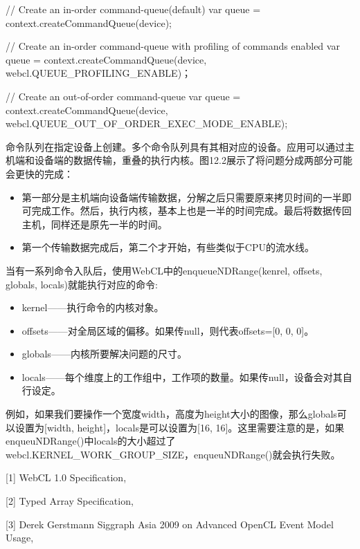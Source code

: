 \begin{codebox}[javascript]
// Create an in-order command-queue(default)
var queue = context.createCommandQueue(device);

// Create an in-order command-queue with profiling of commands enabled
var queue = context.createCommandQueue(device, webcl.QUEUE_PROFILING_ENABLE)；

// Create an out-of-order command-queue
var queue = context.createCommandQueue(device, webcl.QUEUE_OUT_OF_ORDER_EXEC_MODE_ENABLE);
\end{codebox}

命令队列在指定设备上创建。多个命令队列具有其相对应的设备。应用可以通过主机端和设备端的数据传输，重叠的执行内核。图12.2展示了将问题分成两部分可能会更快的完成：


\begin{itemize}
\item 第一部分是主机端向设备端传输数据，分解之后只需要原来拷贝时间的一半即可完成工作。然后，执行内核，基本上也是一半的时间完成。最后将数据传回主机，同样还是原先一半的时间。
\item 第一个传输数据完成后，第二个才开始，有些类似于CPU的流水线。
\end{itemize}

当有一系列命令入队后，使用WebCL中的enqueueNDRange(kenrel, offsets, globals, locals)就能执行对应的命令:

\begin{itemize}
\item kernel——执行命令的内核对象。
\item offsets——对全局区域的偏移。如果传null，则代表offsets=[0, 0, 0]。
\item globals——内核所要解决问题的尺寸。
\item locals——每个维度上的工作组中，工作项的数量。如果传null，设备会对其自行设定。
\end{itemize}

例如，如果我们要操作一个宽度width，高度为height大小的图像，那么globals可以设置为[width, height]，locals是可以设置为[16, 16]。这里需要注意的是，如果enqueuNDRange()中locals的大小超过了webcl.KERNEL\_\allowbreak{}WORK\_\allowbreak{}GROUP\_\allowbreak{}SIZE，enqueuNDRange()就会执行失败。

\myRefRule

\begin{myRefs}

[1] WebCL 1.0 Specification, 

[2] Typed Array Specification, 

[3] Derek Gerstmann Siggraph Asia 2009 on Advanced OpenCL Event Model Usage, 

\end{myRefs}



